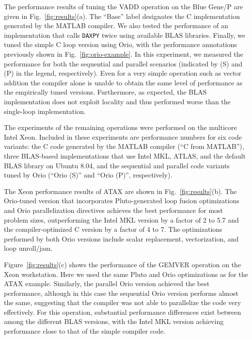 \documentclass[runningheads]{llncs}
\begin{document}
The performance results of tuning the VADD operation on the Blue
Gene/P are given in Fig.~\ref{fig:results}(a). The ``Base'' label
designates the C implementation generated by the MATLAB compiler. We also
tested the performance of an implementation that calls
\texttt{DAXPY} twice using available BLAS libraries.
Finally, we tuned the simple C loop version using Orio, with the performance
annotations previously shown in Fig.~\ref{fig:orio-example}. In this
experiment, we measured the performance for both the sequential and parallel
scenarios (indicated by (S) and (P) in the legend, respectively). Even for a very simple operation such as vector addition the
compiler alone is unable to obtain the same level of performance as the
empirically tuned versions. Furthermore, as expected, the BLAS implementation
does not exploit locality and thus performed worse than the single-loop
implementation.

The experiments of the remaining operations were performed on the
multicore Intel Xeon. Included in these experiments are performance
numbers for six code variants: the C code generated by the MATLAB
compiler (``C from MATLAB''), three BLAS-based implementations that
use Intel MKL, ATLAS, and the default BLAS library on Ubuntu 8.04, and
the sequential and parallel code variants tuned by Orio (``Orio
(S)'' and ``Orio (P)'', respectively).

The Xeon performance results of ATAX are shown in
Fig.~\ref{fig:results}(b). The Orio-tuned version that incorporates
Pluto-generated loop fusion optimizations and Orio parallelization
directives achieves the best performance for most problem sizes,
outperforming the Intel MKL version by a factor of 2 to 5.7 and the
compiler-optimized C version by a factor of 4 to 7. The optimizations
performed by both Orio versions include scalar replacement,
vectorization, and loop unroll/jam.

Figure~\ref{fig:results}(c) shows the performance of the GEMVER
operation on the Xeon workstation. Here we used the same Pluto and Orio
optimizations as for the ATAX example. Similarly, the parallel Orio version
achieved the best performance, although in this case the sequential Orio
version performs almost the same, suggesting that the compiler was not able
to parallelize the code very effectively. For this operation, substantial
performance differences exist between among the different BLAS versions, with
the Intel MKL version achieving performance close to that of the simple
compiler code.
\end{document}
